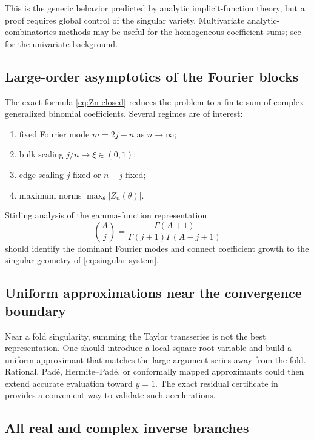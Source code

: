 \documentclass[11pt,oneside]{article}
\theoremstyle{plain}
\theoremstyle{definition}
\theoremstyle{remark}
\newcommand{\abs}[1]{\left\lvert#1\right\rvert}
\begin{document}
This is the generic behavior predicted by analytic implicit-function theory,
but a proof requires global control of the singular variety.  Multivariate
analytic-combinatorics methods may be useful for the homogeneous coefficient
sums; see \cite{FlajoletSedgewick2009} for the univariate background.

\subsection{Large-order asymptotics of the Fourier blocks}

The exact formula \eqref{eq:Zn-closed} reduces the problem to a finite sum of
complex generalized binomial coefficients.  Several regimes are of interest:
\begin{enumerate}
\item fixed Fourier mode \(m=2j-n\) as \(n\to\infty\);
\item bulk scaling \(j/n\to\xi\in(0,1)\);
\item edge scaling \(j\) fixed or \(n-j\) fixed;
\item maximum norms \(\max_\theta\abs{Z_n(\theta)}\).
\end{enumerate}
Stirling analysis of the gamma-function representation
\begin{equation}
 \binom{A}{j}=\frac{\Gamma(A+1)}
 {\Gamma(j+1)\Gamma(A-j+1)}
 \label{eq:binomial-gamma}
\end{equation}
should identify the dominant Fourier modes and connect coefficient growth to
the singular geometry of \eqref{eq:singular-system}.

\subsection{Uniform approximations near the convergence boundary}

Near a fold singularity, summing the Taylor transseries is not the best
representation.  One should introduce a local square-root variable and build
a uniform approximant that matches the large-argument series away from the
fold.  Rational, Pad\'e, Hermite--Pad\'e, or conformally mapped approximants
could then extend accurate evaluation toward \(y=1\).  The exact residual
certificate in  provides a convenient way to
validate such accelerations.

\subsection{All real and complex inverse branches}
\end{document}
